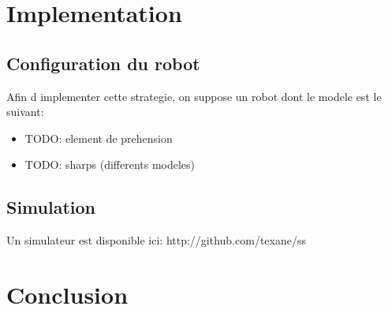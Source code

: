 \documentclass[a4paper, 11pt]{article}
\begin{document}
\newpage
\section{Implementation}
\subsection{Configuration du robot}
Afin d implementer cette strategie, on suppose un robot dont le modele est le suivant:
\begin{itemize}
  \item TODO: element de prehension
  \item TODO: sharps (differents modeles)
\end{itemize}

\subsection{Simulation}
Un simulateur est disponible ici: http://github.com/texane/ss

\newpage
\section{Conclusion}
\end{document}
